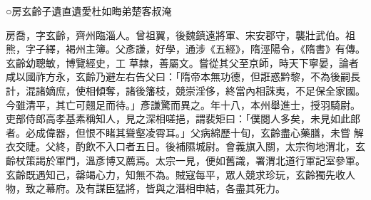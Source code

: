 
\begin{pinyinscope}

 ○房玄齡子遺直遺愛杜如晦弟楚客叔淹



 房喬，字玄齡，齊州臨淄人。曾祖翼，後魏鎮遠將軍、宋安郡守，襲壯武伯。祖熊，字子繹，褐州主簿。父彥謙，好學，通涉《五經》，隋涇陽令，《隋書》有傳。玄齡幼聰敏，博覽經史，工
 草隸，善屬文。嘗從其父至京師，時天下寧晏，論者咸以國祚方永，玄齡乃避左右告父曰：「隋帝本無功德，但誑惑黔黎，不為後嗣長計，混諸嫡庶，使相傾奪，諸後籓枝，競崇淫侈，終當內相誅夷，不足保全家國。今雖清平，其亡可翹足而待。」彥謙驚而異之。年十八，本州舉進士，授羽騎尉。吏部侍郎高孝基素稱知人，見之深相嗟挹，謂裴矩曰：「僕閱人多矣，未見如此郎者。必成偉器，但恨不睹其聳壑凌霄耳。」父病綿歷十旬，玄齡盡心藥膳，未嘗
 解衣交睫。父終，酌飲不入口者五日。後補隰城尉。會義旗入關，太宗徇地渭北，玄齡杖策謁於軍門，溫彥博又薦焉。太宗一見，便如舊識，署渭北道行軍記室參軍。玄齡既遇知己，罄竭心力，知無不為。賊寇每平，眾人競求珍玩，玄齡獨先收人物，致之幕府。及有謀臣猛將，皆與之潛相申結，各盡其死力。




\end{pinyinscope}
